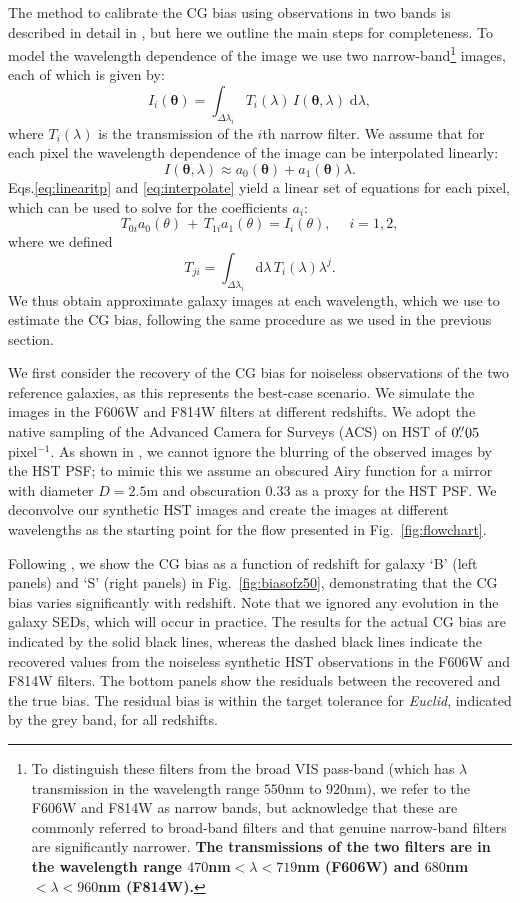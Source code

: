 \documentclass[useAMS,usenatbib]{mnras}
\renewcommand{\d}{\mathrm{d}}
\newcommand{\be}{\begin{equation}}
\newcommand{\ee}{\end{equation}}
\def\elabel#1{\label{eq:#1}}
\begin{document}
The method to calibrate the CG bias using observations in two bands is described in detail in , but here we outline the main steps for completeness. To model the wavelength dependence of the image we use two narrow-band\footnote{To distinguish these filters from the broad VIS pass-band (which has $\lambda$ transmission in the wavelength range $550$nm to $920$nm), we refer to the F606W and F814W as narrow bands, but acknowledge that these are commonly referred to broad-band filters and that genuine narrow-band filters are significantly narrower. {\bf The transmissions of the two filters are in the wavelength range $470$nm$<\lambda<719$nm (F606W) and $680$nm$<\lambda<960$nm (F814W).} } images, each of which is given by:
%
\be
I_i({\bm\theta}) = \int_{\Delta \lambda_i} T_i(\lambda)\, I({\bm \theta},\lambda) \;\d \lambda,
\elabel{linearitp}
\ee
%
where $T_i(\lambda)$ is the transmission of the $i$th narrow filter. We assume that for each pixel the wavelength dependence of the image can be interpolated linearly:
%
\be
I({\bm \theta},\lambda) \approx  a_0({\bm \theta})+a_1({\bm \theta})\lambda.
\elabel{interpolate}
\ee
%
Eqs.\ref{eq:linearitp} and \ref{eq:interpolate} yield a linear set of
equations for each pixel, which can be used to solve for the
coefficients $a_i$:
%
\be
T_{0i} a_0(\theta) \,+\,T_{1i} a_1(\theta) = I_i(\theta), \quad\; i=1,2,
\elabel{lineareq}
\ee
%
where we defined
\be
T_{ji}=\int_{\Delta\lambda_i} \d \lambda\,T_i(\lambda)\lambda^j.
\ee
%
We thus obtain approximate galaxy images at each wavelength, which we use to estimate the CG bias, following the same procedure as we used in the previous section.

We first consider the recovery of the CG bias for noiseless observations of the two reference galaxies, as this represents the best-case scenario. We simulate the images in the F606W and F814W filters at different redshifts. We adopt the native sampling of the Advanced Camera for Surveys (ACS) on HST of  $0\hbox{$.\!\!^{\prime\prime}$}05$ pixel$^{-1}$. As shown in , we cannot ignore the blurring of the observed images by the HST PSF; to mimic this we assume an obscured Airy function for a mirror with diameter $D=2.5$m and obscuration  $0.33$ as a proxy for the HST PSF. We deconvolve our synthetic HST images and create the images at different wavelengths as the starting point for the flow presented in Fig.~\ref{fig:flowchart}.
{\bf }


Following , we show  the CG bias as a function of redshift for galaxy `B' (left panels) and `S' (right panels) in Fig.~\ref{fig:biasofz50}, demonstrating that the CG bias varies significantly with redshift. Note that we ignored any evolution in the galaxy SEDs, which will occur in practice. The results for the actual CG bias are indicated by the solid black lines, whereas the dashed black lines indicate the recovered values from the noiseless synthetic HST observations in the F606W and F814W filters.  The bottom panels show the residuals between the recovered and the true bias. The residual bias is within the target tolerance for {\it Euclid}, indicated by the grey band, for all redshifts.
\end{document}

